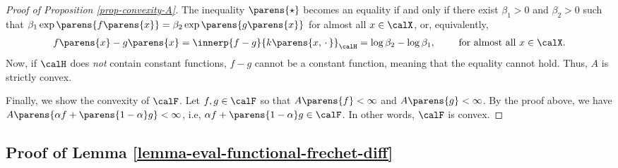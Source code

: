 \documentclass[12pt]{article}
\theoremstyle{definition}
\theoremstyle{theorem}
\theoremstyle{remark}
\begin{document}
\begin{proof}[Proof of Proposition \ref{prop-convexity-A}]
	The inequality $\parens{\star}$ becomes an equality if and only if there exist $\beta_1 > 0$ and $\beta_2 > 0$ such that $\beta_1 \exp \parens{ f \parens{x} } = \beta_2 \exp \parens{g \parens{x}}$ for almost all $x \in \calX$, or, equivalently, 
	\begin{align*}
		f \parens{x} - g \parens{x} = \innerp{f - g}{k \parens{x, \,\cdot\,}}_{\calH} = \log \beta_2 - \log \beta_1, \qquad \text{ for almost all } x \in \calX. 
	\end{align*}
	Now, if $\calH$ does \emph{not} contain constant functions, $f - g$ cannot be a constant function, meaning that the equality cannot hold. Thus, $A$ is strictly convex. 
	
	
	Finally, we show the convexity of $\calF$. Let $f, g \in \calF$ so that $A \parens{f} < \infty$ and $A \parens{g} < \infty$. By the proof above, we have $A \parens{\alpha f + \parens{1 - \alpha} g} < \infty$, i.e, $\alpha f + \parens{1 - \alpha} g \in \calF$. In other words, $\calF$ is convex. 
\end{proof}

\subsection{Proof of Lemma \ref{lemma-eval-functional-frechet-diff}}\label{subsection-proof-lemma-eval-functional-frechet-diff}
\end{document}
